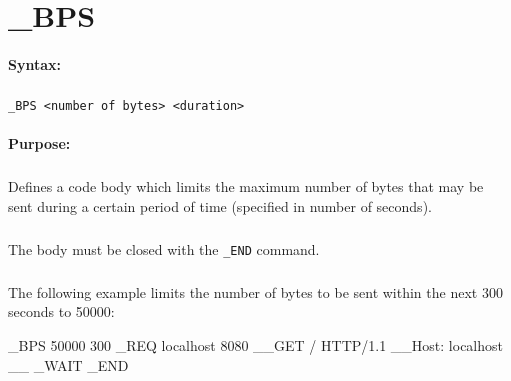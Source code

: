 
\newpage
\section{\_BPS}
\label{cmd:_BPS}

\paragraph{Syntax:}
\subparagraph{}
\texttt{\_BPS <number of bytes> <duration>}

\paragraph{Purpose:}
\subparagraph{}
Defines a code body which limits the maximum number of bytes  
that may be sent during a certain period of time (specified in number of seconds). 

\subparagraph{}
The body must be closed with the \texttt{\_END} command.

\subparagraph{}
The following example limits the number of bytes to be sent within 
the next 300 seconds to 50000:

\begin{usplisting}
    _BPS 50000 300
    _REQ localhost 8080
    __GET / HTTP/1.1
    __Host: localhost
    __
    _WAIT
    _END
\end{usplisting}
